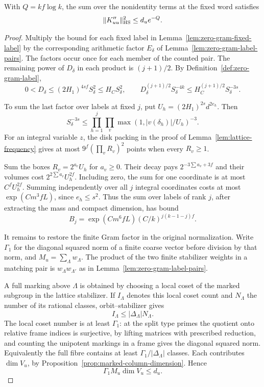 \begin{auxlemma}\label{lem:zero-gram-diagonal}
With \(Q=kf\log k\), the sum over the nonidentity terms at the fixed word satisfies
\[
                      \|K''_{uu}\|_{\rm HS}^2\le d_u e^{-Q}.
\]
\end{auxlemma}
\begin{proof}
Multiply the bound for each fixed label in Lemma~\ref{lem:zero-gram-fixed-label} by the corresponding arithmetic factor \(E_\delta\) of Lemma~\ref{lem:zero-gram-label-pairs}. The factors occur once for each member of the counted pair. The remaining power of \(D_\delta\) in each product is \((j+1)/2\). By Definition~\ref{def:zero-gram-label},
\[
 0<D_\delta\le (2H_1)^{4sf}S_\delta^2\le H_C S_\delta^2,\qquad
 D_\delta^{(j+1)/2}S_\delta^{-4k}
       \le H_C^{(j+1)/2}S_\delta^{-3s}.
\]


To sum the last factor over labels at fixed \(j\), put \(U_h=(2H_1)^{2s}d^{2e_h}\). Then
\[
 S_\delta^{-3s}\le\prod_{h=1}^{j}\prod_v
             \max(1,|v(\delta_h)|/U_h)^{-3}.
\]
For an integral variable \(z\), the disk packing in the proof of Lemma~\ref{lem:lattice-frequency} gives at most \(9^f(\prod_v R_v)^2\) points when every \(R_v\ge1\). 

Sum the boxes \(R_v=2^{a_v}U_h\) for \(a_v\ge0\). Their decay pays \(2^{-3\sum a_v+3f}\) and their volumes cost \(2^{2\sum a_v}U_h^{2f}\). Including zero, the sum for one coordinate is at most \(C^f U_h^{2f}\). Summing independently over all \(j\) integral coordinates costs at most \(\exp(Cm^3fL)\), since \(e_h\le s^2\). Thus the sum over labels of rank \(j\), after extracting the mass and compact dimension, has bound
\[
 B_j=\exp(Cm^6fL)(C/k)^{j(k-1-j)f}.
\]

It remains to restore the finite Gram factor in the original normalization. Write \(\Gamma_1\) for the diagonal squared norm of a finite coarse vector before division by that norm, and \(M_u=\sum_\Lambda w_\Lambda\). The product of the two finite stabilizer weights in a matching pair is \(w_\Lambda w_{\Lambda'}\) as in Lemma~\ref{lem:zero-gram-label-pairs}. 

A full marking above \(\Lambda\) is obtained by choosing a local coset of the marked subgroup in the lattice stabilizer. If \(I_\Lambda\) denotes this local coset count and \(N_\Lambda\) the number of its rational classes, orbit--stabilizer gives
\[
               I_\Lambda\le |\Delta_\Lambda|N_\Lambda .
\] The local coset number is at least \(\Gamma_1\): at the split type primes the quotient onto relative frame indices is surjective, by lifting matrices with prescribed reduction, and counting the unipotent markings in a frame gives the diagonal squared norm. Equivalently the full fibre contains at least \(\Gamma_1/|\Delta_\Lambda|\) classes. Each contributes \(\dim V_u\), by Proposition~\ref{prop:marked-column-dimension}. Hence
\[
                    \Gamma_1 M_u\dim V_u\le d_u .
\]


\end{proof}
